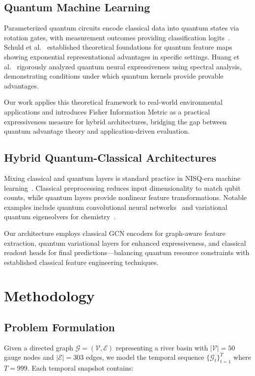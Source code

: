 \documentclass[conference]{IEEEtran}
\begin{document}
\subsection{Quantum Machine Learning}

Parameterized quantum circuits encode classical data into quantum states via rotation gates, with measurement outcomes providing classification logits~\cite{b5}. Schuld et al.~\cite{b11} established theoretical foundations for quantum feature maps showing exponential representational advantages in specific settings. Huang et al.~\cite{b3} rigorously analyzed quantum neural expressiveness using spectral analysis, demonstrating conditions under which quantum kernels provide provable advantages.

Our work applies this theoretical framework to real-world environmental applications and introduces Fisher Information Metric as a practical expressiveness measure for hybrid architectures, bridging the gap between quantum advantage theory and application-driven evaluation.

\subsection{Hybrid Quantum-Classical Architectures}

Mixing classical and quantum layers is standard practice in NISQ-era machine learning~\cite{b5}. Classical preprocessing reduces input dimensionality to match qubit counts, while quantum layers provide nonlinear feature transformations. Notable examples include quantum convolutional neural networks~\cite{b12} and variational quantum eigensolvers for chemistry~\cite{b13}.

Our architecture employs classical GCN encoders for graph-aware feature extraction, quantum variational layers for enhanced expressiveness, and classical readout heads for final predictions---balancing quantum resource constraints with established classical feature engineering techniques.

\section{Methodology}
\label{sec:method}

\subsection{Problem Formulation}

Given a directed graph $\mathcal{G} = (\mathcal{V}, \mathcal{E})$ representing a river basin with $|\mathcal{V}|=50$ gauge nodes and $|\mathcal{E}|=303$ edges, we model the temporal sequence $\{\mathcal{G}_t\}_{t=1}^{T}$ where $T=999$. Each temporal snapshot contains:
\end{document}
